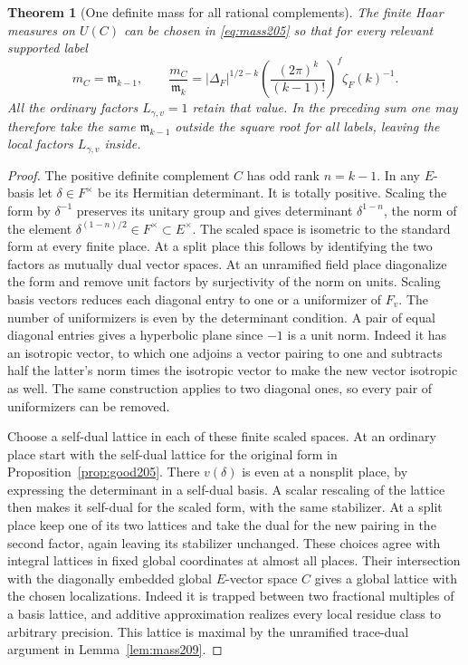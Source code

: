 \documentclass[a4paper,11pt]{article}
\newtheorem{theorem}[proposition]{Theorem}
\theoremstyle{definition}
\theoremstyle{remark}
\numberwithin{equation}{section}
\begin{document}
\begin{theorem}[One definite mass for all rational complements]
\label{thm:complement209}
The finite Haar measures on \(U(C)\) can be chosen in
\eqref{eq:mass205} so that for every relevant supported label
\[
 m_C=\mathfrak m_{k-1},\qquad
 \frac{m_C}{\mathfrak m_k}
   =|\Delta_F|^{1/2-k}
       \left(\frac{(2\pi)^k}{(k-1)!}\right)^f\zeta_F(k)^{-1}.
\]
All the ordinary factors \(L_{\gamma,v}=1\) retain that value.
In the preceding sum one may therefore take the same
\(\mathfrak m_{k-1}\) outside the square root for all labels,
leaving the local factors \(L_{\gamma,v}\) inside.
\end{theorem}
\begin{proof}
The positive definite complement \(C\) has odd rank \(n=k-1\).
In any \(E\)-basis let \(\delta\in F^\times\) be its Hermitian
determinant. It is totally positive. Scaling the form by
\(\delta^{-1}\) preserves its unitary group and gives determinant
\(\delta^{1-n}\), the norm of the element
\(\delta^{(1-n)/2}\in F^\times\subset E^\times\).
The scaled space is isometric to the standard form at every
finite place. At a split place this follows by identifying the
two factors as mutually dual vector spaces. At an unramified
field place diagonalize the form and remove unit factors by
surjectivity of the norm on units. Scaling basis vectors reduces
each diagonal entry to one or a uniformizer of \(F_v\).
The number of uniformizers is even by the determinant condition.
A pair of equal diagonal entries gives a hyperbolic plane since
\(-1\) is a unit norm. Indeed it has an isotropic vector, to
which one adjoins a vector pairing to one and subtracts half
the latter's norm times the isotropic vector to make the new
vector isotropic as well. The same construction applies to
two diagonal ones, so every pair of uniformizers can be removed.

Choose a self-dual lattice in each of these finite scaled spaces.
At an ordinary place start with the self-dual lattice for the
original form in Proposition~\ref{prop:good205}. There
\(v(\delta)\) is even at a nonsplit place, by expressing
the determinant in a self-dual basis. A scalar rescaling of
the lattice then makes it self-dual for the scaled form, with
the same stabilizer. At a split place keep one of its two
lattices and take the dual for the new pairing in the second
factor, again leaving its stabilizer unchanged. These choices
agree with integral lattices in fixed global coordinates
at almost all places. Their intersection with the diagonally
embedded global \(E\)-vector space \(C\)
gives a global lattice with the chosen localizations. Indeed
it is trapped between two fractional multiples of a basis
lattice, and additive approximation realizes every local residue
class to arbitrary precision. This lattice is maximal by the
unramified trace-dual argument in Lemma~\ref{lem:mass209}.


\end{proof}
\end{document}
